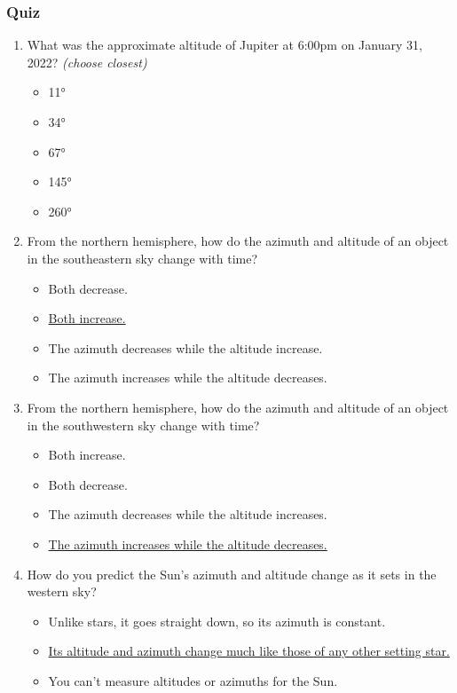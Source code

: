 \documentclass[12pt]{article}
\begin{document}
\subsubsection{Quiz}
\begin{enumerate}
\item%
What was the approximate altitude of Jupiter at 6:00pm on January 31, 2022? \emph{(choose closest)}
\begin{itemize}
    \item 11°
    \item 34°
    \item 67°
    \item 145°
    \item 260°
\end{itemize}
\item
From the northern hemisphere, how do the azimuth and altitude of an object in the southeastern sky change with time?
\begin{itemize}
    \item Both decrease.
    \item \underline{Both increase.}
    \item The azimuth decreases while the altitude increase.
    \item The azimuth increases while the altitude decreases.
\end{itemize}
\item
From the northern hemisphere, how do the azimuth and altitude of an object in the southwestern sky change with time?
\begin{itemize}
    \item Both increase.
    \item Both decrease.
    \item The azimuth decreases while the altitude increases.
    \item \underline{The azimuth increases while the altitude decreases.}
\end{itemize}
\item
How do you predict the Sun's azimuth and altitude change as it sets in the western sky?
\begin{itemize}
    \item Unlike stars, it goes straight down, so its azimuth is constant.
    \item \underline{Its altitude and azimuth change much like those of any other setting star.}
    \item You can't measure altitudes or azimuths for the Sun.
\end{itemize}
\end{enumerate}
\end{document}
